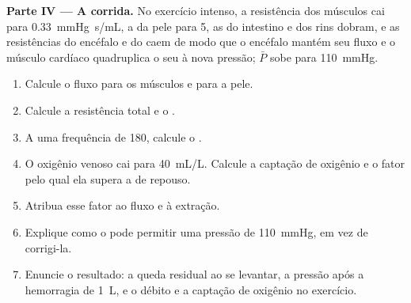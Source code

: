 \begin{problem}
\medskip
\noindent\textbf{Parte IV --- A corrida.}
No exercício intenso, a resistência dos músculos cai para
\qty{0.33}{mmHg.s/mL}, a da pele para 5, as do intestino e dos rins
dobram, e as resistências do encéfalo e do  caem de modo que o
encéfalo mantém seu fluxo e o músculo cardíaco quadruplica o seu à nova
pressão; $\bar P$ sobe para \qty{110}{mmHg}.
\begin{enumerate}[resume]
  \item Calcule o fluxo para os músculos e para a pele.
  \item Calcule a resistência total e o .
  \item A uma frequência de 180, calcule o .
  \item O oxigênio venoso cai para \qty{40}{mL/L}. Calcule a captação de
        oxigênio e o fator pelo qual ela supera a de repouso.
  \item Atribua esse fator ao fluxo e à extração.
  \item Explique como o  pode permitir uma pressão de
        \qty{110}{mmHg}, em vez de corrigi-la.
  \item Enuncie o resultado: a queda residual ao se levantar, a pressão
        após a hemorragia de \qty{1}{L}, e o débito e a captação de
        oxigênio no exercício.
\end{enumerate}
\end{problem}
